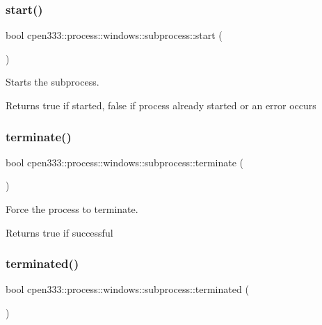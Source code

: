 \subsubsection{\texorpdfstring{start()}{start()}}
{\footnotesize\ttfamily bool cpen333\+::process\+::windows\+::subprocess\+::start (\begin{DoxyParamCaption}{ }\end{DoxyParamCaption})\hspace{0.3cm}{\ttfamily [inline]}}



Starts the subprocess. 

\begin{DoxyReturn}{Returns}
true if started, false if process already started or an error occurs 
\end{DoxyReturn}
\mbox{\label{classcpen333_1_1process_1_1windows_1_1subprocess_ae45daefd812b9629baa9b42d0ac8cd15}} 
\subsubsection{\texorpdfstring{terminate()}{terminate()}}
{\footnotesize\ttfamily bool cpen333\+::process\+::windows\+::subprocess\+::terminate (\begin{DoxyParamCaption}{ }\end{DoxyParamCaption})\hspace{0.3cm}{\ttfamily [inline]}}



Force the process to terminate. 

\begin{DoxyReturn}{Returns}
true if successful 
\end{DoxyReturn}
\mbox{\label{classcpen333_1_1process_1_1windows_1_1subprocess_a7fc3a589bdd4cde9adb09fc3debf9bc9}} 
\subsubsection{\texorpdfstring{terminated()}{terminated()}}
{\footnotesize\ttfamily bool cpen333\+::process\+::windows\+::subprocess\+::terminated (\begin{DoxyParamCaption}{ }\end{DoxyParamCaption})\hspace{0.3cm}{\ttfamily [inline]}}



